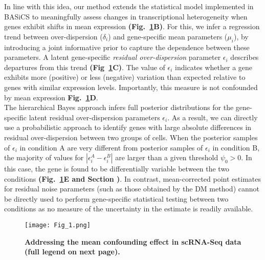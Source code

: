 In line with this idea, our method extends the statistical model implemented in BASiCS \citep{Vallejos2015BASiCS, Vallejos2016} to meaningfully assess changes in transcriptional heterogeneity when genes exhibit shifts in mean expression \textbf{(Fig.~\ref{fig2:Schematic_model}B)}. For this, we infer a regression trend between over-dispersion ($\delta_i$) and gene-specific mean parameters ($\mu_i$), by introducing a joint informative prior to capture the dependence between these parameters. A latent gene-specific \textit{residual over-dispersion} parameter $\epsilon_i$ describes departures from this trend \textbf{(Fig~\ref{fig2:Schematic_model}C)}. The value of $\epsilon_i$ indicates whether a gene exhibits more (positive) or less (negative) variation than expected relative to genes with similar expression levels. Importantly, this measure is not confounded by mean expression \textbf{Fig.~\ref{fig2:Schematic_model}D}. \\

The hierarchical Bayes approach infers full posterior distributions for the gene-specific latent residual over-dispersion parameters $\epsilon_i$. As a result, we can directly use a probabilistic approach to identify genes with large absolute differences in residual over-dispersion between two groups of cells. When the posterior samples of $\epsilon_i$ in condition A are very different from posterior samples of $\epsilon_i$ in condition B, the majority of values for $|\epsilon_i^A - \epsilon_i^B|$ are larger than a given threshold $\psi_0>0$. In this case, the gene is found to be differentially variable between the two conditions  \textbf{(Fig.~\ref{fig2:Schematic_model}E and Section \label{sec0:decision})}. In contrast, mean-corrected point estimates for residual noise parameters (such as those obtained by the DM method) cannot be directly used to perform gene-specific statistical testing between two conditions as no measure of the uncertainty in the estimate is readily available.\\

\newpage

\begin{figure}[!h]
\centering
\texttt{[image: Fig\_1.png]}
\caption[Addressing the mean confounding effect in scRNA-Seq data]{\textbf{Addressing the mean confounding effect in scRNA-Seq data (full legend on next page).}\\}
\label{fig2:Schematic_model}
\end{figure}

\newpage

